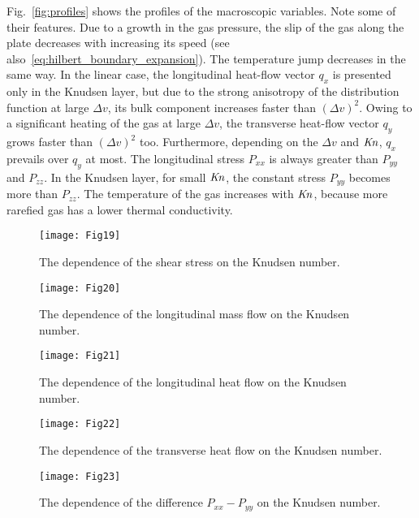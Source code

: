 \documentclass[]{jfm}
\newcommand{\Kn}{\mbox{\textit{Kn}}}
\begin{document}
Fig.~\ref{fig:profiles} shows the profiles of the macroscopic variables.
Note some of their features.
Due to a growth in the gas pressure, the slip of the gas along the plate decreases
with increasing its speed (see also~\eqref{eq:hilbert_boundary_expansion}).
The temperature jump decreases in the same way.
In the linear case, the longitudinal heat-flow vector \(q_x\) is presented only in the Knudsen layer,
but due to the strong anisotropy of the distribution function at large \(\Delta{v}\),
its bulk component increases faster than \((\Delta{v})^2\).
Owing to a significant heating of the gas at large \(\Delta{v}\),
the transverse heat-flow vector \(q_y\) grows faster than \((\Delta{v})^2\) too.
Furthermore, depending on the \(\Delta{v}\) and \(\Kn\), \(q_x\) prevails over \(q_y\) at most.
The longitudinal stress \(P_{xx}\) is always greater than \(P_{yy}\) and \(P_{zz}\).
In the Knudsen layer, for small \(\Kn\), the constant stress \(P_{yy}\) becomes more than \(P_{zz}\).
The temperature of the gas increases with \(\Kn\), because more rarefied gas
has a lower thermal conductivity.

\begin{figure}
    \centering
    \texttt{[image: Fig19]}
    \caption{The dependence of the shear stress on the Knudsen number.}
    \label{fig:shear}
\end{figure}

\begin{figure}
    \centering
    \texttt{[image: Fig20]}
    \caption{The dependence of the longitudinal mass flow on the Knudsen number.}
    \label{fig:flow}
\end{figure}

\begin{figure}
    \centering
    \texttt{[image: Fig21]}
    \caption{The dependence of the longitudinal heat flow on the Knudsen number.}
    \label{fig:qflow}
\end{figure}

\begin{figure}
    \centering
    \texttt{[image: Fig22]}
    \caption{The dependence of the transverse heat flow on the Knudsen number.}
    \label{fig:qflowy}
\end{figure}

\begin{figure}
    \centering
    \texttt{[image: Fig23]}
    \caption{The dependence of the difference \(P_{xx}-P_{yy}\) on the Knudsen number.}
    \label{fig:pxx}
\end{figure}
\end{document}

